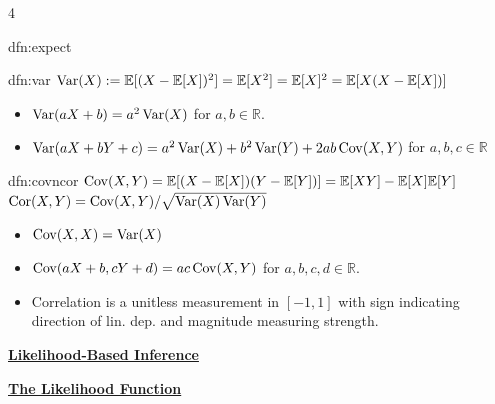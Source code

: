 \documentclass[landscape, 8pt]{extarticle}
\begin{document}
\begin{multicols*}{4}
\begin{dfn}[Expectation]{dfn:expect}{ }
		\end{dfn}
		
		
		\begin{dfn}[Variance]{dfn:var}{ }
			$\operatorname{Var}(X) := \mathbb{E}[(X - \mathbb{E}[X])^2] = \mathbb{E}[X^2] = \mathbb{E}[X]^2 = \mathbb{E}[X(X - \mathbb{E}[X])]$ 
			\begin{itemize}
				\item $\operatorname{Var} (aX + b) = a^2\operatorname{Var}(X)$ for $a, b\in \mathbb{R}$.
				\item $\operatorname{Var}(aX + bY + c) = a^2\operatorname{Var}(X) + b^2\operatorname{Var}(Y) + 2ab\operatorname{Cov}(X, Y)$ for $a, b, c\in \mathbb{R}$
			\end{itemize}
			
		\end{dfn}
		
		
		\begin{dfn}{dfn:covncor}{ }
			$\operatorname{Cov}(X, Y) = \mathbb{E}[(X - \mathbb{E}[X]) (Y - \mathbb{E}[Y])] = \mathbb{E}[XY] - \mathbb{E}[X]\mathbb{E}[Y]$\\
			$\operatorname{Cor}(X, Y) = \operatorname{Cov}(X, Y)/\sqrt{\operatorname{Var}(X) \operatorname{Var}(Y)}$
			\begin{itemize}
				\item $\operatorname{Cov}(X, X) = \operatorname{Var}(X)$
				\item $\operatorname{Cov}(aX +b, cY + d) = ac\operatorname{Cov}(X, Y)$ for $a, b, c, d\in \mathbb{R}$.
				\item Correlation is a unitless measurement in $[-1, 1]$ with sign indicating direction of lin. dep. and magnitude measuring strength.
			\end{itemize}
			
		\end{dfn}
		
		

{\footnotesize \textbf{\underline{Likelihood-Based Inference}}}
	
	{\tiny\textbf{\underline{The Likelihood Function}}}
		

\end{multicols*}
\end{document}
